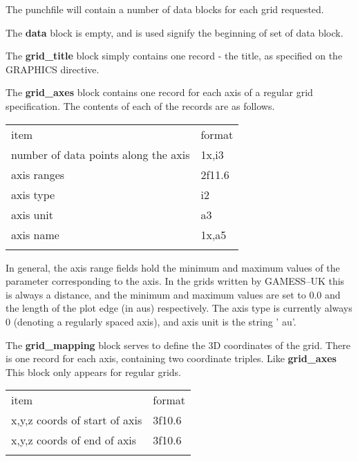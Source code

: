 \documentclass[11pt,fleqn]{article}
\begin{document}
The punchfile will contain a number of data blocks for each grid requested.

The {\bf data} block is empty, and is used signify the beginning of set of data
block.

The {\bf grid\_title} block simply contains one record - the title, as specified on the GRAPHICS
directive.

The {\bf grid\_axes} block contains one record for each axis of a regular 
grid specification. The contents of each of the records are as follows.

 \begin{centering}
 \begin{tabular}{ll}
\\ \hline
  item         & format\\ \cline{1-2}
number of data points along the axis  &  1x,i3 \\
axis ranges & 2f11.6 \\
axis type  &  i2 \\
axis unit  &  a3  \\
axis name  &  1x,a5 \\
\hline
\\
 \end{tabular}

 \end{centering}

In general, the axis range fields hold the minimum and maximum values of the 
parameter corresponding to the axis. In the grids written by GAMESS--UK this is always 
a distance, and the minimum and maximum values are set to 0.0 and the length of the 
plot edge (in aus) respectively.
The axis type is currently always 0 (denoting a regularly spaced axis), 
and axis unit is the string ' au'.

The {\bf grid\_mapping} block serves to define the 3D coordinates of the grid.
There is one record for each axis, containing two coordinate triples. Like {\bf grid\_axes} This block only
appears for regular grids.

 \begin{centering}
 \begin{tabular}{ll}
\\ \hline
  item         & format\\ \cline{1-2}
x,y,z coords of start of axis & 3f10.6\\
x,y,z coords of end of axis & 3f10.6\\
\hline
\\
 \end{tabular}

 \end{centering}
\end{document}
